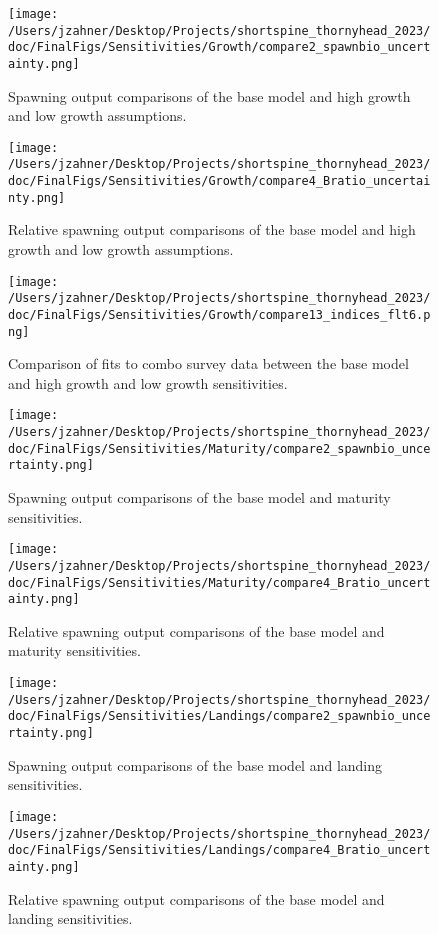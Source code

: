 \documentclass[11pt,
  english,
  letterpaper,
]{article}
\begin{document}
\begin{figure}
\centering
\texttt{[image: /Users/jzahner/Desktop/Projects/shortspine\_thornyhead\_2023/doc/FinalFigs/Sensitivities/Growth/compare2\_spawnbio\_uncertainty.png]}
\caption{Spawning output comparisons of the base model and high growth and low growth assumptions.\label{fig:growth_sensitiv_spawning}}
\end{figure}

\begin{figure}
\centering
\texttt{[image: /Users/jzahner/Desktop/Projects/shortspine\_thornyhead\_2023/doc/FinalFigs/Sensitivities/Growth/compare4\_Bratio\_uncertainty.png]}
\caption{Relative spawning output comparisons of the base model and high growth and low growth assumptions.\label{fig:growth_sensitiv_mngmt}}
\end{figure}

\begin{figure}
\centering
\texttt{[image: /Users/jzahner/Desktop/Projects/shortspine\_thornyhead\_2023/doc/FinalFigs/Sensitivities/Growth/compare13\_indices\_flt6.png]}
\caption{Comparison of fits to combo survey data between the base model and high growth and low growth sensitivities.\label{fig:growth_sensitiv_indx}}
\end{figure}

\begin{figure}
\centering
\texttt{[image: /Users/jzahner/Desktop/Projects/shortspine\_thornyhead\_2023/doc/FinalFigs/Sensitivities/Maturity/compare2\_spawnbio\_uncertainty.png]}
\caption{Spawning output comparisons of the base model and maturity sensitivities.\label{fig:mat_sensitiv_spawning}}
\end{figure}

\begin{figure}
\centering
\texttt{[image: /Users/jzahner/Desktop/Projects/shortspine\_thornyhead\_2023/doc/FinalFigs/Sensitivities/Maturity/compare4\_Bratio\_uncertainty.png]}
\caption{Relative spawning output comparisons of the base model and maturity sensitivities.\label{fig:mat_sensitiv_mngmt}}
\end{figure}

\begin{figure}
\centering
\texttt{[image: /Users/jzahner/Desktop/Projects/shortspine\_thornyhead\_2023/doc/FinalFigs/Sensitivities/Landings/compare2\_spawnbio\_uncertainty.png]}
\caption{Spawning output comparisons of the base model and landing sensitivities.\label{fig:land_sensitiv_spawning}}
\end{figure}

\begin{figure}
\centering
\texttt{[image: /Users/jzahner/Desktop/Projects/shortspine\_thornyhead\_2023/doc/FinalFigs/Sensitivities/Landings/compare4\_Bratio\_uncertainty.png]}
\caption{Relative spawning output comparisons of the base model and landing sensitivities.\label{fig:land_sensitiv_mngmt}}
\end{figure}
\end{document}
